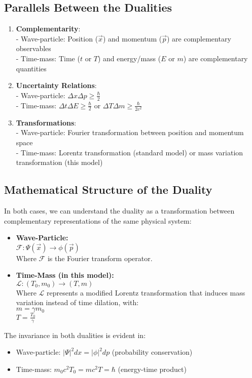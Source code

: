 \documentclass[a4paper,12pt]{article}
\begin{document}
	\subsection{Parallels Between the Dualities}
	\begin{enumerate}
		\item \textbf{Complementarity}: \\
		- Wave-particle: Position (\( \vec{x} \)) and momentum (\( \vec{p} \)) are complementary observables \\
		- Time-mass: Time (\( t \) or \( T \)) and energy/mass (\( E \) or \( m \)) are complementary quantities
		\item \textbf{Uncertainty Relations}: \\
		- Wave-particle: \( \Delta x \Delta p \geq \frac{\hbar}{2} \) \\
		- Time-mass: \( \Delta t \Delta E \geq \frac{\hbar}{2} \) or \( \Delta T \Delta m \geq \frac{\hbar}{2c^2} \)
		\item \textbf{Transformations}: \\
		- Wave-particle: Fourier transformation between position and momentum space \\
		- Time-mass: Lorentz transformation (standard model) or mass variation transformation (this model)
	\end{enumerate}
	
	\subsection{Mathematical Structure of the Duality}
	In both cases, we can understand the duality as a transformation between complementary representations of the same physical system:
	\begin{itemize}
		\item \textbf{Wave-Particle:} \\
		\( \mathcal{F}: \Psi(\vec{x}) \rightarrow \phi(\vec{p}) \) \\
		Where \( \mathcal{F} \) is the Fourier transform operator.
		\item \textbf{Time-Mass (in this model):} \\
		\( \mathcal{L}: (T_0, m_0) \rightarrow (T, m) \) \\
		Where \( \mathcal{L} \) represents a modified Lorentz transformation that induces mass variation instead of time dilation, with: \\
		\( m = \gamma m_0 \) \\
		\( T = \frac{T_0}{\gamma} \)
	\end{itemize}
	The invariance in both dualities is evident in:
	\begin{itemize}
		\item Wave-particle: \( |\Psi|^2 dx = |\phi|^2 dp \) (probability conservation)
		\item Time-mass: \( m_0c^2T_0 = mc^2T = \hbar \) (energy-time product)
	\end{itemize}
	
\end{document}

